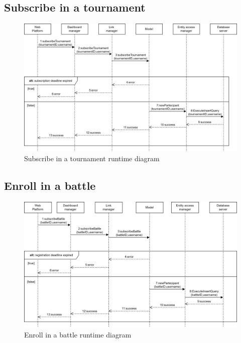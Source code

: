 \subsection*{Subscribe in a tournament}
\begin{figure}[h]
    \centering
    \includegraphics[width=\textwidth]{images/runtime/subsT.png}
    \caption{Subscribe in a tournament runtime diagram}
    \label{fig:rt-subsT}
\end{figure}
\clearpage

\subsection*{Enroll in a battle}
\begin{figure}[h]
    \centering
    \includegraphics[width=\textwidth]{images/runtime/enrollB.png}
    \caption{Enroll in a battle runtime diagram}
    \label{fig:rt-enrollB}
\end{figure}

